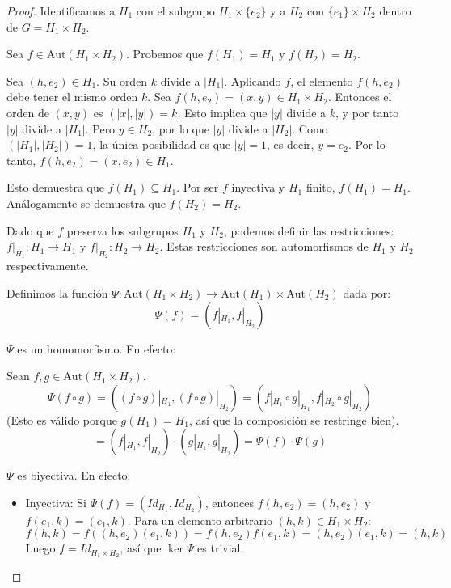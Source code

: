 \begin{proof}
    Identificamos a $H_1$ con el subgrupo $H_1 \times \{e_2\}$ y a $H_2$ con $\{e_1\} \times H_2$ dentro de $G = H_1 \times H_2$.
    
    Sea $f \in \text{Aut}(H_1 \times H_2)$. Probemos que $f(H_1) = H_1$ y $f(H_2) = H_2$.
    
    Sea $(h, e_2) \in H_1$. Su orden $k$ divide a $|H_1|$.
    Aplicando $f$, el elemento $f(h, e_2)$ debe tener el mismo orden $k$.
    Sea $f(h, e_2) = (x, y) \in H_1 \times H_2$.
    Entonces el orden de $(x, y)$ es $(|x|, |y|) = k$.
    Esto implica que $|y|$ divide a $k$, y por tanto $|y|$ divide a $|H_1|$.
    Pero $y \in H_2$, por lo que $|y|$ divide a $|H_2|$.
    Como $(|H_1|, |H_2|) = 1$, la única posibilidad es que $|y| = 1$, es decir, $y = e_2$.
    Por lo tanto, $f(h, e_2) = (x, e_2) \in H_1$.
    
    Esto demuestra que $f(H_1) \subseteq H_1$. Por ser $f$ inyectiva y $H_1$ finito, $f(H_1) = H_1$.
    Análogamente se demuestra que $f(H_2) = H_2$.

    Dado que $f$ preserva los subgrupos $H_1$ y $H_2$, podemos definir las restricciones:
    $f|_{H_1}: H_1 \to H_1$ y $f|_{H_2}: H_2 \to H_2$.
    Estas restricciones son automorfismos de $H_1$ y $H_2$ respectivamente.
    
    Definimos la función $\Psi: \text{Aut}(H_1 \times H_2) \to \text{Aut}(H_1) \times \text{Aut}(H_2)$ dada por:
    \begin{equation*}
        \Psi(f) = (f|_{H_1}, f|_{H_2})
    \end{equation*}
    
    $\Psi$ es un homomorfismo. En efecto:

    Sean $f, g \in \text{Aut}(H_1 \times H_2)$.
    \begin{equation*}
        \Psi(f \circ g) = ((f \circ g)|_{H_1}, (f \circ g)|_{H_2}) = (f|_{H_1} \circ g|_{H_1}, f|_{H_2} \circ g|_{H_2})
    \end{equation*}
    (Esto es válido porque $g(H_1) = H_1$, así que la composición se restringe bien).
    \begin{equation*}
        = (f|_{H_1}, f|_{H_2}) \cdot (g|_{H_1}, g|_{H_2}) = \Psi(f) \cdot \Psi(g)
    \end{equation*}

    $\Psi$ es biyectiva. En efecto:
    \begin{itemize}
        \item Inyectiva: Si $\Psi(f) = (Id_{H_1}, Id_{H_2})$, entonces $f(h, e_2) = (h, e_2)$ y $f(e_1, k) = (e_1, k)$.
        Para un elemento arbitrario $(h, k) \in H_1 \times H_2$:
        \begin{equation*}
            f(h, k) = f((h, e_2)(e_1, k)) = f(h, e_2)f(e_1, k) = (h, e_2)(e_1, k) = (h, k)
        \end{equation*}
        Luego $f = Id_{H_1 \times H_2}$, así que $\ker \Psi$ es trivial.
        

\end{itemize}
\end{proof}
